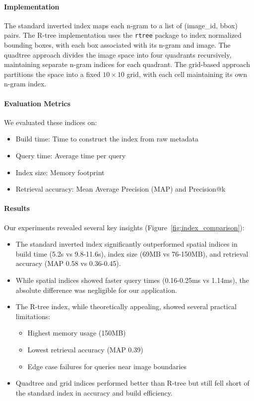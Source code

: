 \documentclass[sigconf,screen]{acmart}
\begin{document}
\paragraph{Implementation} The standard inverted index maps each n-gram to a list of (image\_id, bbox) pairs. The R-tree implementation uses the \verb|rtree| package to index normalized bounding boxes, with each box associated with its n-gram and image. The quadtree approach divides the image space into four quadrants recursively, maintaining separate n-gram indices for each quadrant. The grid-based approach partitions the space into a fixed $10\times10$ grid, with each cell maintaining its own n-gram index.

\paragraph{Evaluation Metrics} We evaluated these indices on:
\begin{itemize}
    \item Build time: Time to construct the index from raw metadata
    \item Query time: Average time per query
    \item Index size: Memory footprint
    \item Retrieval accuracy: Mean Average Precision (MAP) and Precision@k
\end{itemize}

\paragraph{Results} Our experiments revealed several key insights (Figure~\ref{fig:index_comparison}):

\begin{itemize}
    \item The standard inverted index significantly outperformed spatial indices in build time (5.2s vs 9.8-11.6s), index size (69MB vs 76-150MB), and retrieval accuracy (MAP 0.58 vs 0.36-0.45).
    \item While spatial indices showed faster query times (0.16-0.25ms vs 1.14ms), the absolute difference was negligible for our application.
    \item The R-tree index, while theoretically appealing, showed several practical limitations:
          \begin{itemize}
              \item Highest memory usage (150MB)
              \item Lowest retrieval accuracy (MAP 0.39)
              \item Edge case failures for queries near image boundaries
          \end{itemize}
    \item Quadtree and grid indices performed better than R-tree but still fell short of the standard index in accuracy and build efficiency.
\end{itemize}
\end{document}
